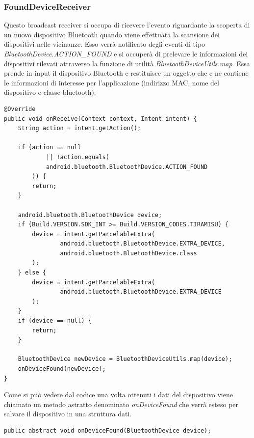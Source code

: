 \subsubsection{FoundDeviceReceiver}
Questo broadcast receiver si occupa di ricevere l'evento riguardante la scoperta di un nuovo dispositivo Bluetooth quando viene effettuata la scansione dei dispositivi nelle vicinanze. Esso verrà notificato degli eventi di tipo \textit{BluetoothDevice.ACTION\_FOUND} e si occuperà di prelevare le informazioni dei dispositivi rilevati attraverso la funzione di utilità \textit{BluetoothDeviceUtils.map}. Essa prende in input il dispositivo Bluetooth e restituisce un oggetto che e ne contiene le informazioni di interesse per l'applicazione (indirizzo MAC, nome del dispositivo e classe bluetooth).
\begin{verbatim}
@Override
public void onReceive(Context context, Intent intent) {
    String action = intent.getAction();

    if (action == null 
            || !action.equals(
            android.bluetooth.BluetoothDevice.ACTION_FOUND
        )) {
        return;
    }
    
    android.bluetooth.BluetoothDevice device;
    if (Build.VERSION.SDK_INT >= Build.VERSION_CODES.TIRAMISU) {
        device = intent.getParcelableExtra(
                android.bluetooth.BluetoothDevice.EXTRA_DEVICE,
                android.bluetooth.BluetoothDevice.class
        );
    } else {
        device = intent.getParcelableExtra(
                android.bluetooth.BluetoothDevice.EXTRA_DEVICE
        );
    }
    if (device == null) {
        return;
    }
    
    BluetoothDevice newDevice = BluetoothDeviceUtils.map(device);
    onDeviceFound(newDevice);
}
\end{verbatim}

Come si può vedere dal codice una volta ottenuti i dati del dispositivo viene chiamato un metodo astratto denominato \textit{onDeviceFound} che verrà esteso per salvare il dispositivo in una struttura dati.
\begin{verbatim}
public abstract void onDeviceFound(BluetoothDevice device);
\end{verbatim}



